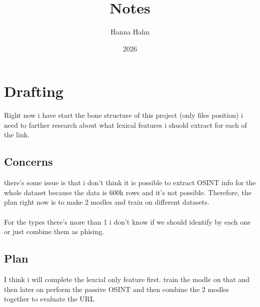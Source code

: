 \documentclass{article}
\title{Notes}
\author{Hanna Hahn}
\date{2026}
\begin{document}
\maketitle

\section{Drafting}
Right now i have start the bone structure of this project (only files position)
i need to farther research about what lexical features i shuold extract for each of the link.
\subsection{Concerns}
there's some issue is that i don't think it is possible to extract OSINT info for the whole dataset 
because the data is 600k rows and it's not possible. Therefore, the plan right now is to make 2 modles and train on
different datasets.
\\
\\
For the types there's more than 1 i don't know if we should identify by each one or just combine them as phising.
\subsection{Plan}
I think i will complete the lexcial only feature first. train the modle on that and then later on perform the 
passive OSINT and then combine the 2 modles together to evaluate the URL
\end{document}
